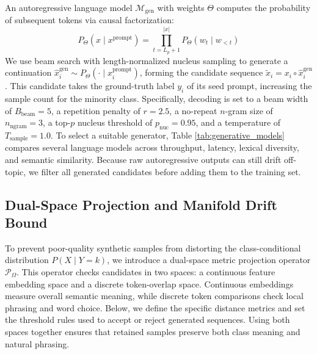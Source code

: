 \documentclass[10pt,journal,compsoc]{IEEEtran}
\begin{document}
An autoregressive language model $\mathcal{M}_{\text{gen}}$ with weights $\Theta$ computes the probability of subsequent tokens via causal factorization:
\begin{equation}
    P_\Theta(x \mid x^{\text{prompt}}) = \prod_{t=L_p+1}^{|x|} P_\Theta(w_t \mid w_{<t})
\end{equation}
We use beam search with length-normalized nucleus sampling to generate a continuation $\hat{x}_i^{\text{gen}} \sim P_\Theta(\cdot \mid x_i^{\text{prompt}})$, forming the candidate sequence $\tilde{x}_i = x_i \circ \hat{x}_i^{\text{gen}}$. This candidate takes the ground-truth label $y_i$ of its seed prompt, increasing the sample count for the minority class. Specifically, decoding is set to a beam width of $B_{\text{beam}}=5$, a repetition penalty of $r=2.5$, a no-repeat $n$-gram size of $n_{\text{ngram}}=3$, a top-$p$ nucleus threshold of $p_{\text{nuc}}=0.95$, and a temperature of $T_{\text{sample}}=1.0$. To select a suitable generator, Table \ref{tab:generative_models} compares several language models across throughput, latency, lexical diversity, and semantic similarity. Because raw autoregressive outputs can still drift off-topic, we filter all generated candidates before adding them to the training set.

\begin{table}[!t]
\caption{Benchmarking Candidate Generative Backbone Models Across Latency, Diversity, and Semantic Fidelity}
\label{tab:generative_models}
\centering

\end{table}

\subsection{Dual-Space Projection and Manifold Drift Bound}
\label{subsec:drift_bound}

To prevent poor-quality synthetic samples from distorting the class-conditional distribution $P(X \mid Y=k)$, we introduce a dual-space metric projection operator $\mathcal{P}_\Omega$. This operator checks candidates in two spaces: a continuous feature embedding space and a discrete token-overlap space. Continuous embeddings measure overall semantic meaning, while discrete token comparisons check local phrasing and word choice. Below, we define the specific distance metrics and set the threshold rules used to accept or reject generated sequences. Using both spaces together ensures that retained samples preserve both class meaning and natural phrasing.
\end{document}
